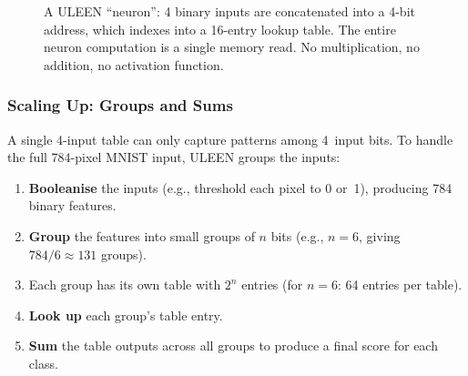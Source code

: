 \begin{figure}[htbp]
\caption{A ULEEN ``neuron'': 4 binary inputs are concatenated into a
  4-bit address, which indexes into a 16-entry lookup table. The entire
  neuron computation is a single memory read. No multiplication,
  no addition, no activation function.}
\label{fig:uleen-neuron}
\end{figure}

\subsubsection{Scaling Up: Groups and Sums}

A single 4-input table can only capture patterns among 4~input bits.
To handle the full 784-pixel MNIST input, ULEEN groups the inputs:

\begin{enumerate}[leftmargin=2em]
  \item \textbf{Booleanise} the inputs (e.g., threshold each pixel
    to 0 or~1), producing 784 binary features.
  \item \textbf{Group} the features into small groups of $n$ bits
    (e.g., $n = 6$, giving $784 / 6 \approx 131$ groups).
  \item Each group has its own table with $2^n$ entries (for $n = 6$:
    64 entries per table).
  \item \textbf{Look up} each group's table entry.
  \item \textbf{Sum} the table outputs across all groups to produce
    a final score for each class.
\end{enumerate}

